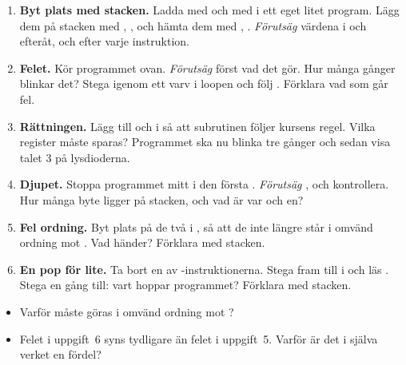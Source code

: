 \begin{enumerate}
  \item \textbf{Byt plats med stacken.} Ladda  med  och  med
     i ett eget litet program. Lägg dem på stacken med , ,
    och hämta dem med , . \emph{Förutsäg} värdena i  och
     efteråt, och  efter varje instruktion.
  \item \textbf{Felet.} Kör programmet ovan. \emph{Förutsäg} först vad det gör. Hur många gånger
    blinkar det? Stega igenom ett varv i loopen och följ . Förklara vad som går fel.
  \item \textbf{Rättningen.} Lägg till  och  i  så att
    subrutinen följer kursens regel. Vilka register måste sparas? Programmet ska nu blinka tre
    gånger och sedan visa talet 3 på lysdioderna.
  \item \textbf{Djupet.} Stoppa programmet mitt i den första . \emph{Förutsäg}
    , och kontrollera. Hur många byte ligger på stacken, och vad är var och en?
  \item \textbf{Fel ordning.} Byt plats på de två  i , så att de inte
    längre står i omvänd ordning mot . Vad händer? Förklara med stacken.
  \item \textbf{En pop för lite.} Ta bort en av -instruktionerna. Stega fram till
     i  och läs . Stega en gång till: vart hoppar programmet?
    Förklara med stacken.
\end{enumerate}

\begin{itemize}
  \item Varför måste  göras i omvänd ordning mot ?
  \item Felet i uppgift~6 syns tydligare än felet i uppgift~5. Varför är det i själva verket en
    fördel?
\end{itemize}

